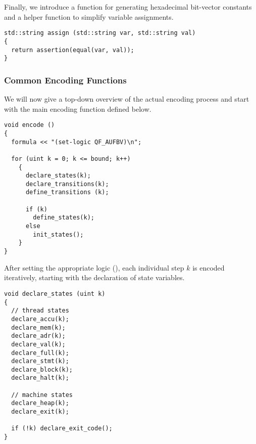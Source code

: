 \noindent
Finally, we introduce a function  for generating hexadecimal bit-vector constants and a helper function to simplify variable assignments.

%
%

\begin{lstlisting}[style=c++]
std::string assign (std::string var, std::string val)
{
  return assertion(equal(var, val));
}
\end{lstlisting}


\subsubsection*{Common Encoding Functions}

We will now give a top-down overview of the actual encoding process and start with the main encoding function defined below.

\begin{lstlisting}[style=c++]
void encode ()
{
  formula << "(set-logic QF_AUFBV)\n";

  for (uint k = 0; k <= bound; k++)
    {
      declare_states(k);
      declare_transitions(k);
      define_transitions (k);

      if (k)
        define_states(k);
      else
        init_states();
    }
}
\end{lstlisting}

\noindent
After setting the appropriate logic (), each individual step $k$ is encoded iteratively, starting with the declaration of state variables.


\begin{lstlisting}[style=c++]
void declare_states (uint k)
{
  // thread states
  declare_accu(k);
  declare_mem(k);
  declare_adr(k);
  declare_val(k);
  declare_full(k);
  declare_stmt(k);
  declare_block(k);
  declare_halt(k);

  // machine states
  declare_heap(k);
  declare_exit(k);

  if (!k) declare_exit_code();
}
\end{lstlisting}

